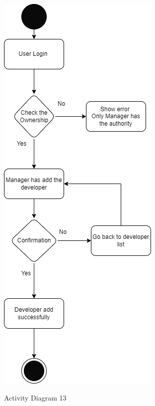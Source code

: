 \begin{figure}[H]
    \centering
    \caption{Activity Diagram 13}
    \includegraphics[scale=0.5]{./diagrams/Activity Diagram/ad-13.png}
    \label{fig:act-13}

\end{figure}


